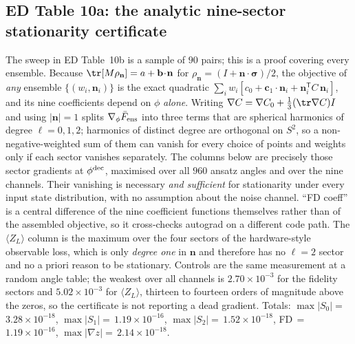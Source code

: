 \documentclass[10pt,a4paper]{article}
\begin{document}
\subsection*{ED Table 10a: the analytic nine-sector stationarity certificate}
The sweep in ED Table~10b is a sample of $90$ pairs; this is a proof covering
every ensemble. Because $\tr[M\rho_{\mathbf n}]=a+\mathbf b\!\cdot\!\mathbf n$
for $\rho_{\mathbf n}=(I+\mathbf n\!\cdot\!\boldsymbol\sigma)/2$, the objective
of \emph{any} ensemble $\{(w_i,\mathbf n_i)\}$ is the exact quadratic
$\sum_i w_i[c_0+\mathbf c_1\!\cdot\!\mathbf n_i+\mathbf n_i^{\mathsf T}C\,
\mathbf n_i]$, and its nine coefficients depend on $\phi$ \emph{alone}. Writing
$\nabla C=\nabla C_0+\tfrac13(\tr\nabla C)I$ and using $|\mathbf n|=1$ splits
$\nabla_\phi\bar F_{\rm ens}$ into three terms that are spherical harmonics of
degree $\ell=0,1,2$; harmonics of distinct degree are orthogonal on $S^2$, so a
non-negative-weighted sum of them can vanish for every choice of points and
weights only if each sector vanishes separately. The columns below are precisely
those sector gradients at $\phi^{\rm dec}$, maximised over all $960$ ansatz
angles and over the nine channels. Their vanishing is necessary \emph{and
sufficient} for stationarity under every input state distribution, with no
assumption about the noise channel. ``FD coeff'' is a central difference of the
nine coefficient functions themselves rather than of the assembled objective, so
it cross-checks autograd on a different code path. The $\langle Z_L\rangle$
column is the maximum over the four sectors of the hardware-style observable
loss, which is only \emph{degree one} in $\mathbf n$ and therefore has no
$\ell=2$ sector and no a priori reason to be stationary. Controls are the same
measurement at a random angle table; the weakest over all channels is $2.70\times 10^{-3}$ for the
fidelity sectors and $5.02\times 10^{-3}$ for $\langle Z_L\rangle$, thirteen to fourteen orders of
magnitude above the zeros, so the certificate is not reporting a dead gradient.
Totals: $\max|S_0|=$\,$3.28\times 10^{-18}$, $\max|S_1|=$\,$1.19\times 10^{-16}$, $\max|S_2|=$\,$1.52\times 10^{-18}$,
FD\,$=$\,$1.19\times 10^{-16}$, $\max|\nabla z|=$\,$2.14\times 10^{-18}$.
\end{document}
